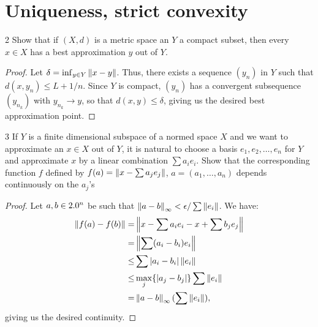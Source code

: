 \section{Uniqueness, strict convexity}


\begin{exercise}{2}
Show that if $(X, d)$ is a metric space an $Y$ a compact subset, then every $x \in X$ has a best approximation $y$ out of $Y$.
\end{exercise}
\begin{proof}
Let $\delta = \inf_{y \in Y} \left\lVert x - y\right\rVert$.
Thus, there exists a sequence $(y_n)$ in $Y$ such that $d(x,y_n) \leq L + 1/n$.
Since $Y$ is compact, $(y_n)$ has a convergent subsequence $(y_{n_k})$ with $y_{n_k} \to y$, so that $d(x, y) \leq \delta$, giving us the desired best approximation point.
\end{proof} 

\begin{exercise}{3}
If $Y$ is a finite dimensional subspace of a normed space $X$ and we want to approximate an $x \in X$ out of $Y$, it is natural to choose a basis $e_1, e_2, \dots, e_n$ for $Y$ and approximate $x$ by a linear combination $\sum a_i e_i$.
Show that the corresponding function $f$ defined by $f(a) = \left\lVert x - \sum a_j e_j\right\rVert$, $a = (a_1, \dots, a_n)$ depends continuously on the $a_j$'s
\end{exercise}
\begin{proof}
Let $a, b \in 2.0^n$ be such that $\left\lVert a-b\right\rVert_\infty < \epsilon/\sum\left\lVert e_i\right\rVert$.
We have:
\begin{align*}
    \left\lVert f(a) - f(b)\right\rVert
    =& \left\lVert x - \sum a_i e_i - x + \sum b_j e_j\right\rVert\\
    =& \left\lVert \sum(a_i - b_i) e_i\right\rVert\\
    \leq& \sum \left\lvert a_i - b_i\right\rvert\left\lVert e_i\right\rVert\\
    \leq& \max_j \{\left\lvert a_j - b_j\right\rvert\} \sum \left\lVert e_i\right\rVert\\
    =& \left\lVert a-b\right\rVert_\infty (\sum \left\lVert e_i\right\rVert),
\end{align*}
giving us the desired continuity.
\end{proof} 

